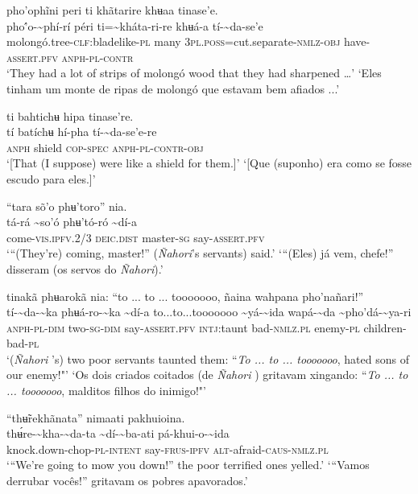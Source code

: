 \documentclass[output=paper,
modfonts,nonflat
]{langsci/langscibook}
\begin{document}
\ea pho'ophĩni peri ti khãtarire khʉaa tinase'e.\\[.3em]
\gll pho'́o-{\textasciitilde}phí-rí	péri	ti={\textasciitilde}kháta-ri-re	khʉá-a	tí-{\textasciitilde}da-se'e\\
     molongó.tree-\textsc{clf:}bladelike-\textsc{pl}	many	3\textsc{pl.poss}=cut.separate-\textsc{nmlz-obj}	have-\textsc{assert.pfv}	\textsc{anph-pl-contr}\\
\glt ‘They had a lot of strips of molongó wood that they had sharpened …’
\glt ‘Eles tinham um monte de ripas de molongó que estavam bem afiados ...’
\z 

\ea ti bahtichʉ hipa tinase're.\\[.3em]
\gll tí	batíchʉ	hí-pha	tí-{\textasciitilde}da-se'e-re\\
     \textsc{anph}	shield	\textsc{cop-spec}	\textsc{anph-pl-contr-obj}\\
\glt ‘[That (I suppose) were like a shield for them.]’
\glt ‘[Que (suponho) era como se fosse escudo para eles.]’
\z 

\ea “tara sõ'o phʉ'toro” nia.\\[.3em]
\gll tá-rá	{\textasciitilde}so'ó	phʉ'tó-ró	{\textasciitilde}dí-a\\
     come-\textsc{vis.ipfv.}2/3	\textsc{deic.dist}	master\textsc{-sg}	say-\textsc{assert.pfv}\\
\glt ‘“(They're) coming, master!” (\textit{Ñahori}'s servants) said.’
\glt ‘“(Eles) já vem, chefe!” disseram (os servos do \textit{Ñahori}).’
\z 

\ea tinakã phʉarokã nia: “to ... to ... tooooooo, ñaina wahpana pho'nañari!”\\[.3em]
\gll tí-{\textasciitilde}da-{\textasciitilde}ka	phʉá-ro-{\textasciitilde}ka	{\textasciitilde}dí-a	to...to...tooooooo	{\textasciitilde}yá-{\textasciitilde}ida	wapá-{\textasciitilde}da	{\textasciitilde}pho'dá-{\textasciitilde}ya-ri\\
     \textsc{anph-pl-dim}	two\textsc{-sg-dim}	say-\textsc{assert.pfv}	\textsc{intj:}taunt	bad-\textsc{nmlz.pl}	enemy-\textsc{pl}	children-bad\textsc{-pl}\\
\glt ‘(\textit{Ñahori} 's) two poor servants taunted them: “\textit{To ... to ... tooooooo}, hated sons of our enemy!"’
\glt ‘Os dois criados coitados (de \textit{Ñahori} ) gritavam xingando: “\textit{To ... to ... tooooooo}, malditos filhos do inimigo!"’
\z 

\ea “thʉ̃rekhãnata” nimaati pakhuioina. \\[.3em]
\gll {\textasciitilde}thʉ́re-{\textasciitilde}kha-{\textasciitilde}da-ta	{\textasciitilde}dí-{\textasciitilde}ba-ati	pá-khui-o-{\textasciitilde}ida\\
     knock.down-chop-\textsc{pl-intent}	say-\textsc{frus-ipfv}	\textsc{alt}-afraid-\textsc{caus-nmlz.pl}\\
\glt ‘“We're going to mow you down!” the poor terrified ones yelled.’
\glt ‘“Vamos derrubar vocês!” gritavam os pobres apavorados.’
\z 
\end{document}
